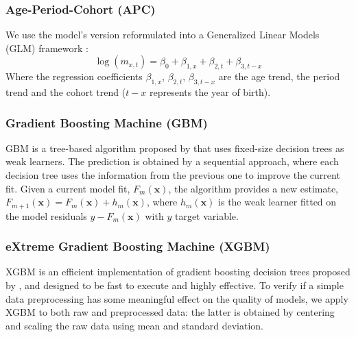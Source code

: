 \documentclass[a4,11pt]{article}
\begin{document}
\subsubsection{Age-Period-Cohort (APC)}
We use the model's version reformulated into a Generalized Linear Models (GLM) framework \cite{Alai2014}:
\begin{equation} 
\label{eq:APC}
\log{\left(m_{x,t}\right)}=\beta_{0} +\beta_{1,x}+\beta_{2,t} +\beta_{3,t-x}
\end{equation}
Where the regression coefficients $\beta_{1,x}$, $\beta_{2,t}$, $\beta_{3,t-x}$ are the age trend, the period trend and the cohort trend ($t-x$ represents the year of birth).

\subsubsection{Gradient Boosting Machine (GBM)}
GBM is a tree-based algorithm proposed by \cite{Friedman} that uses fixed-size decision trees as weak learners. The prediction is obtained by a sequential approach, where each decision tree uses the information from the previous one to improve the current fit. Given a current model fit, $F_{m}(\mathbf{x})$, the algorithm provides a new estimate, $F_{m+1}(\mathbf{x})=F_{m}(\mathbf{x})+ h_m(\mathbf{x})$, where $h_m(\mathbf{x})$ is the weak learner fitted on the model residuals $y-F_{m}(\mathbf{x})$ with $y$ target variable.

\subsubsection{eXtreme Gradient Boosting Machine (XGBM)}
XGBM is an efficient implementation of gradient boosting decision trees proposed by \cite{Chen}, and designed to be fast to execute and highly effective. To verify if a simple data preprocessing has some meaningful effect on the quality of models, we apply XGBM to both raw and preprocessed data: the latter is obtained by centering and scaling the raw data using mean and standard deviation.
\end{document}
